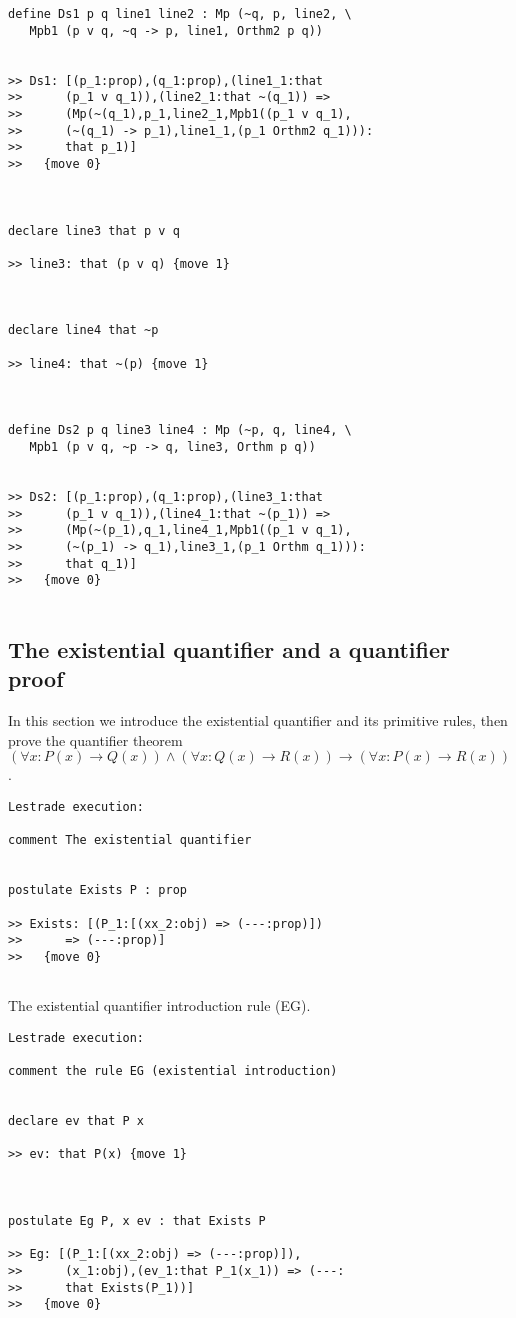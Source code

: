 \documentclass[12pt]{article}
\begin{document}
\begin{verbatim}
define Ds1 p q line1 line2 : Mp (~q, p, line2, \
   Mpb1 (p v q, ~q -> p, line1, Orthm2 p q))


>> Ds1: [(p_1:prop),(q_1:prop),(line1_1:that
>>      (p_1 v q_1)),(line2_1:that ~(q_1)) =>
>>      (Mp(~(q_1),p_1,line2_1,Mpb1((p_1 v q_1),
>>      (~(q_1) -> p_1),line1_1,(p_1 Orthm2 q_1))):
>>      that p_1)]
>>   {move 0}



declare line3 that p v q

>> line3: that (p v q) {move 1}



declare line4 that ~p

>> line4: that ~(p) {move 1}



define Ds2 p q line3 line4 : Mp (~p, q, line4, \
   Mpb1 (p v q, ~p -> q, line3, Orthm p q))


>> Ds2: [(p_1:prop),(q_1:prop),(line3_1:that
>>      (p_1 v q_1)),(line4_1:that ~(p_1)) =>
>>      (Mp(~(p_1),q_1,line4_1,Mpb1((p_1 v q_1),
>>      (~(p_1) -> q_1),line3_1,(p_1 Orthm q_1))):
>>      that q_1)]
>>   {move 0}


\end{verbatim}

\subsection{The existential quantifier and a quantifier proof}

In this section we introduce the existential quantifier and its primitive rules, then prove the quantifier theorem $(\forall x:P(x) \rightarrow Q(x)) \wedge (\forall x:Q(x) \rightarrow R(x)) \rightarrow (\forall x:P(x) \rightarrow R(x))$.

\begin{verbatim}Lestrade execution:

comment The existential quantifier


postulate Exists P : prop

>> Exists: [(P_1:[(xx_2:obj) => (---:prop)])
>>      => (---:prop)]
>>   {move 0}


\end{verbatim}

The existential quantifier introduction rule (EG).

\begin{verbatim}Lestrade execution:

comment the rule EG (existential introduction)


declare ev that P x

>> ev: that P(x) {move 1}



postulate Eg P, x ev : that Exists P

>> Eg: [(P_1:[(xx_2:obj) => (---:prop)]),
>>      (x_1:obj),(ev_1:that P_1(x_1)) => (---:
>>      that Exists(P_1))]
>>   {move 0}


\end{verbatim}
\end{document}
